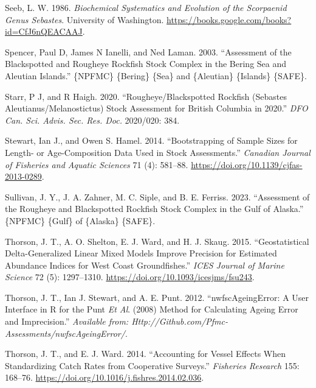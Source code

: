 \documentclass[
]{scrartcl}
\newlength{\cslhangindent}
\newenvironment{CSLReferences}[2] %
 {\begin{list}{}{%
  \setlength{\itemindent}{0pt}
  \setlength{\leftmargin}{0pt}
  \setlength{\parsep}{0pt}
  \ifodd #1
   \setlength{\leftmargin}{\cslhangindent}
   \setlength{\itemindent}{-1\cslhangindent}
  \fi
  \setlength{\itemsep}{#2\baselineskip}}}
 {\end{list}}
\begin{document}
\begin{CSLReferences}{1}{0}
Seeb, L. W. 1986. \emph{Biochemical {Systematics} and {Evolution} of the
{Scorpaenid} {Genus} {Sebastes}}. University of Washington.
\url{https://books.google.com/books?id=CfJ6nQEACAAJ}.

Spencer, Paul D, James N Ianelli, and Ned Laman. 2003. {``Assessment of
the {Blackspotted} and {Rougheye} {Rockfish} {Stock} {Complex} in the
{Bering} {Sea} and {Aleutian} {Islands}.''} \{NPFMC\} \{Bering\} \{Sea\}
and \{Aleutian\} \{Islands\} \{SAFE\}.

Starr, P J, and R Haigh. 2020. {``Rougheye/{Blackspotted} {Rockfish}
({Sebastes} Aleutianus/Melanostictus) Stock Assessment for {British}
{Columbia} in 2020.''} \emph{DFO Can. Sci. Advis. Sec. Res. Doc.}
2020/020: 384.

Stewart, Ian J., and Owen S. Hamel. 2014. {``Bootstrapping of Sample
Sizes for Length- or Age-Composition Data Used in Stock Assessments.''}
\emph{Canadian Journal of Fisheries and Aquatic Sciences} 71 (4):
581--88. \url{https://doi.org/10.1139/cjfas-2013-0289}.

Sullivan, J. Y., J. A. Zahner, M. C. Siple, and B. E. Ferriss. 2023.
{``Assessment of the {Rougheye} and {Blackspotted} {Rockfish} Stock
Complex in the {Gulf} of {Alaska}.''} \{NPFMC\} \{Gulf\} of \{Alaska\}
\{SAFE\}.

Thorson, J. T., A. O. Shelton, E. J. Ward, and H. J. Skaug. 2015.
{``Geostatistical Delta-Generalized Linear Mixed Models Improve
Precision for Estimated Abundance Indices for {West} {Coast}
Groundfishes.''} \emph{ICES Journal of Marine Science} 72 (5):
1297--1310. \url{https://doi.org/10.1093/icesjms/fsu243}.

Thorson, J. T., Ian J. Stewart, and A. E. Punt. 2012.
{``{nwfscAgeingError}: A User Interface in {R} for the {P}unt \emph{Et
Al}. (2008) Method for Calculating Ageing Error and Imprecision.''}
\emph{Available from:
Http://Github.com/Pfmc-Assessments/nwfscAgeingError/}.

Thorson, J. T., and E. J. Ward. 2014. {``Accounting for Vessel Effects
When Standardizing Catch Rates from Cooperative Surveys.''}
\emph{Fisheries Research} 155: 168--76.
\url{https://doi.org/10.1016/j.fishres.2014.02.036}.


\end{CSLReferences}
\end{document}
